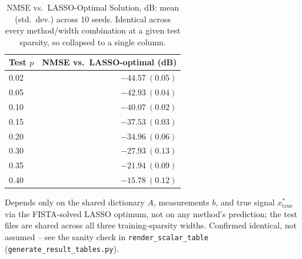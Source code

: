 \begin{table}[htbp]
\centering
\caption{NMSE vs.\ LASSO-Optimal Solution, dB: mean (std.\ dev.) across 10 seeds. Identical across every method/width combination at a given test sparsity, so collapsed to a single column.}
\label{tab:exp2-nmse-lassoopt}
\begin{tabular}{@{} l r @{}}
\toprule
Test $p$ & NMSE vs.\ LASSO-optimal (dB) \\
\midrule
0.02 & $-44.57\ (0.05)$ \\
0.05 & $-42.93\ (0.04)$ \\
0.10 & $-40.07\ (0.02)$ \\
0.15 & $-37.53\ (0.03)$ \\
0.20 & $-34.96\ (0.06)$ \\
0.30 & $-27.93\ (0.13)$ \\
0.35 & $-21.94\ (0.09)$ \\
0.40 & $-15.78\ (0.12)$ \\
\bottomrule
\end{tabular}
\vspace{2pt}
\begin{minipage}{\linewidth}\footnotesize
Depends only on the shared dictionary $A$, measurements $b$, and true signal $x^*_{\text{true}}$ via the FISTA-solved LASSO optimum, not on any method's prediction; the test files are shared across all three training-sparsity widths. Confirmed identical, not assumed -- see the sanity check in \texttt{render\_scalar\_table} (\texttt{generate\_result\_tables.py}).
\end{minipage}
\end{table}
